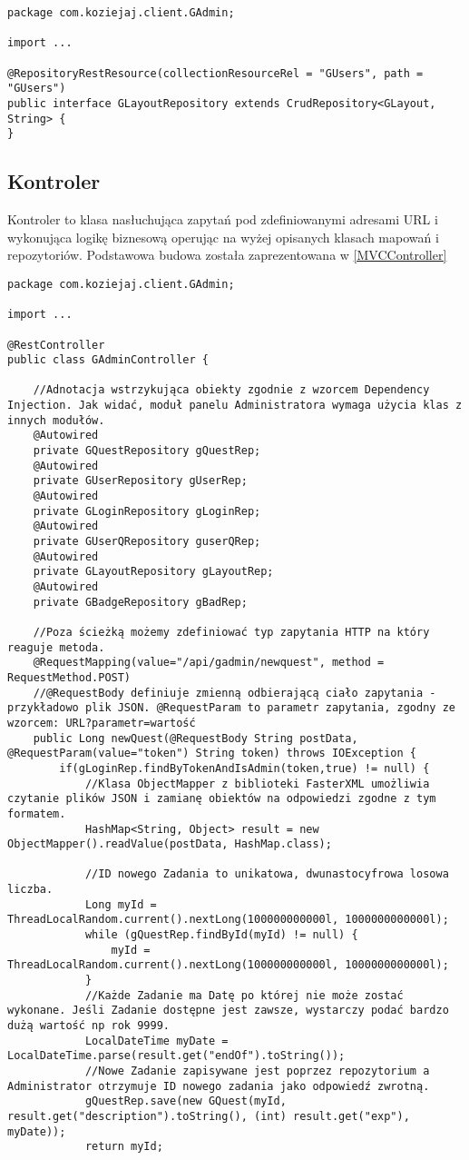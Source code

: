 \documentclass[a4paper,12pt,twoside,openany]{report}
\begin{document}
\begin{lstlisting}
package com.koziejaj.client.GAdmin;

import ...

@RepositoryRestResource(collectionResourceRel = "GUsers", path = "GUsers")
public interface GLayoutRepository extends CrudRepository<GLayout, String> {
}

\end{lstlisting}
\subsection{Kontroler}
Kontroler to klasa nasłuchująca  zapytań pod zdefiniowanymi adresami URL i wykonująca logikę biznesową operując na wyżej opisanych klasach mapowań i repozytoriów. Podstawowa budowa została zaprezentowana w \ref{MVCController}
\begin{lstlisting}
package com.koziejaj.client.GAdmin;

import ...

@RestController
public class GAdminController {

	//Adnotacja wstrzykująca obiekty zgodnie z wzorcem Dependency Injection. Jak widać, moduł panelu Administratora wymaga użycia klas z innych modułów.
    @Autowired
    private GQuestRepository gQuestRep;
    @Autowired
    private GUserRepository gUserRep;
    @Autowired
    private GLoginRepository gLoginRep;
    @Autowired
    private GUserQRepository guserQRep;
    @Autowired
    private GLayoutRepository gLayoutRep;
    @Autowired
    private GBadgeRepository gBadRep;
	
	//Poza ścieżką możemy zdefiniować typ zapytania HTTP na który reaguje metoda.
    @RequestMapping(value="/api/gadmin/newquest", method = RequestMethod.POST)
    //@RequestBody definiuje zmienną odbierającą ciało zapytania - przykładowo plik JSON. @RequestParam to parametr zapytania, zgodny ze wzorcem: URL?parametr=wartość
    public Long newQuest(@RequestBody String postData, @RequestParam(value="token") String token) throws IOException {
        if(gLoginRep.findByTokenAndIsAdmin(token,true) != null) {
	        //Klasa ObjectMapper z biblioteki FasterXML umożliwia czytanie plików JSON i zamianę obiektów na odpowiedzi zgodne z tym formatem.
            HashMap<String, Object> result = new ObjectMapper().readValue(postData, HashMap.class);
            
			//ID nowego Zadania to unikatowa, dwunastocyfrowa losowa liczba.
            Long myId = ThreadLocalRandom.current().nextLong(100000000000l, 1000000000000l);
            while (gQuestRep.findById(myId) != null) {
                myId = ThreadLocalRandom.current().nextLong(100000000000l, 1000000000000l);
            }
            //Każde Zadanie ma Datę po której nie może zostać wykonane. Jeśli Zadanie dostępne jest zawsze, wystarczy podać bardzo dużą wartość np rok 9999.
            LocalDateTime myDate = LocalDateTime.parse(result.get("endOf").toString());
            //Nowe Zadanie zapisywane jest poprzez repozytorium a Administrator otrzymuje ID nowego zadania jako odpowiedź zwrotną.
            gQuestRep.save(new GQuest(myId, result.get("description").toString(), (int) result.get("exp"), myDate));
            return myId;


\end{lstlisting}
\end{document}
